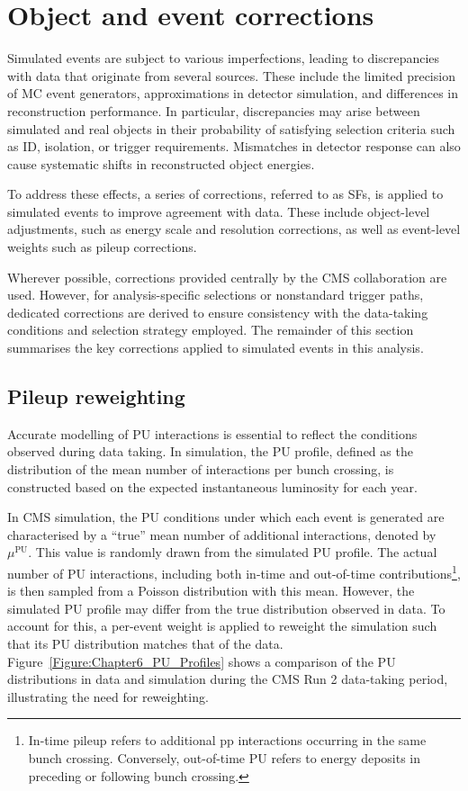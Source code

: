 \section{Object and event corrections}

Simulated events are subject to various imperfections, leading to discrepancies with data that originate from several sources. These include the limited precision of MC event generators, approximations in detector simulation, and differences in reconstruction performance. In particular, discrepancies may arise between simulated and real objects in their probability of satisfying selection criteria such as ID, isolation, or trigger requirements. Mismatches in detector response can also cause systematic shifts in reconstructed object energies.

To address these effects, a series of corrections, referred to as \acp{SF}, is applied to simulated events to improve agreement with data. These include object-level adjustments, such as energy scale and resolution corrections, as well as event-level weights such as pileup corrections.

Wherever possible, corrections provided centrally by the CMS collaboration are used. However, for analysis-specific selections or nonstandard trigger paths, dedicated corrections are derived to ensure consistency with the data-taking conditions and selection strategy employed. The remainder of this section summarises the key corrections applied to simulated events in this analysis.

\subsection{Pileup reweighting}

Accurate modelling of PU interactions is essential to reflect the conditions observed during data taking. In simulation, the PU profile, defined as the distribution of the mean number of interactions per bunch crossing, is constructed based on the expected instantaneous luminosity for each year. 

In CMS simulation, the PU conditions under which each event is generated are characterised by a ``true'' mean number of additional interactions, denoted by $\mu^{\text{PU}}$. This value is randomly drawn from the simulated PU profile. The actual number of PU interactions, including both in-time and out-of-time contributions\footnote{In-time pileup refers to additional pp interactions occurring in the same bunch crossing. Conversely, out-of-time PU refers to energy deposits in preceding or following bunch crossing.}, is then sampled from a Poisson distribution with this mean. However, the simulated PU profile may differ from the true distribution observed in data. To account for this, a per-event weight is applied to reweight the simulation such that its PU distribution matches that of the data. Figure~\ref{Figure:Chapter6_PU_Profiles} shows a comparison of the PU distributions in data and simulation during the CMS Run 2 data-taking period, illustrating the need for reweighting.

